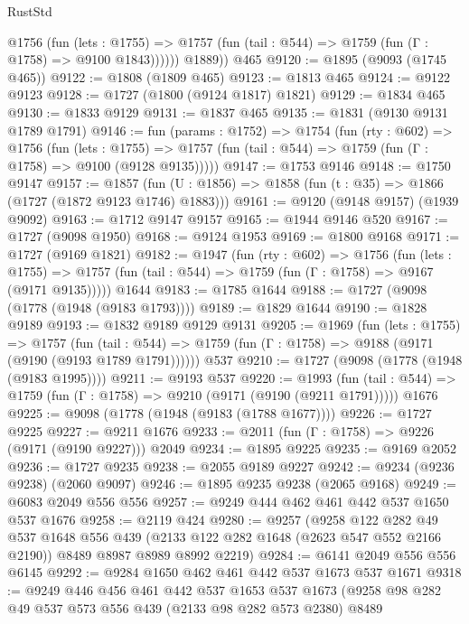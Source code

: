 \begin{lexlean}{RustStd}
\begin{coremodule}
            @1756
              (fun (lets : @1755) =>
              @1757 (fun (tail : @544) => @1759 (fun (Γ : @1758) => @9100 @1843))))))
        @1889))
    @465
@9120 := @1895 (@9093 (@1745 @465))
@9122 := @1808 (@1809 @465)
@9123 := @1813 @465
@9124 := @9122 @9123
@9128 := @1727 (@1800 (@9124 @1817) @1821)
@9129 := @1834 @465
@9130 := @1833 @9129
@9131 := @1837 @465
@9135 := @1831 (@9130 @9131 @1789 @1791)
@9146 := fun (params : @1752) =>
  @1754
    (fun (rty : @602) =>
    @1756
      (fun (lets : @1755) =>
      @1757 (fun (tail : @544) => @1759 (fun (Γ : @1758) => @9100 (@9128 @9135)))))
@9147 := @1753 @9146
@9148 := @1750 @9147
@9157 := @1857 (fun (U : @1856) => @1858 (fun (t : @35) => @1866 (@1727 (@1872 @9123 @1746) @1883)))
@9161 := @9120 (@9148 @9157) (@1939 @9092)
@9163 := @1712 @9147 @9157
@9165 := @1944 @9146 @520
@9167 := @1727 (@9098 @1950)
@9168 := @9124 @1953
@9169 := @1800 @9168
@9171 := @1727 (@9169 @1821)
@9182 := @1947
    (fun (rty : @602) =>
    @1756
      (fun (lets : @1755) =>
      @1757 (fun (tail : @544) => @1759 (fun (Γ : @1758) => @9167 (@9171 @9135)))))
    @1644
@9183 := @1785 @1644
@9188 := @1727 (@9098 (@1778 (@1948 (@9183 @1793))))
@9189 := @1829 @1644
@9190 := @1828 @9189
@9193 := @1832 @9189 @9129 @9131
@9205 := @1969
    (fun (lets : @1755) =>
    @1757
      (fun (tail : @544) => @1759 (fun (Γ : @1758) => @9188 (@9171 (@9190 (@9193 @1789 @1791))))))
    @537
@9210 := @1727 (@9098 (@1778 (@1948 (@9183 @1995))))
@9211 := @9193 @537
@9220 := @1993
    (fun (tail : @544) => @1759 (fun (Γ : @1758) => @9210 (@9171 (@9190 (@9211 @1791)))))
    @1676
@9225 := @9098 (@1778 (@1948 (@9183 (@1788 @1677))))
@9226 := @1727 @9225
@9227 := @9211 @1676
@9233 := @2011 (fun (Γ : @1758) => @9226 (@9171 (@9190 @9227))) @2049
@9234 := @1895 @9225
@9235 := @9169 @2052
@9236 := @1727 @9235
@9238 := @2055 @9189 @9227
@9242 := @9234 (@9236 @9238) (@2060 @9097)
@9246 := @1895 @9235 @9238 (@2065 @9168)
@9249 := @6083 @2049 @556 @556
@9257 := @9249 @444 @462 @461 @442 @537 @1650 @537 @1676
@9258 := @2119 @424
@9280 := @9257
    (@9258
      @122
      @282
      @49
      @537
      @1648
      @556
      @439
      (@2133 @122 @282 @1648 (@2623 @547 @552 @2166 @2190))
      @8489
      @8987
      @8989
      @8992
      @2219)
@9284 := @6141 @2049 @556 @556 @6145
@9292 := @9284 @1650 @462 @461 @442 @537 @1673 @537 @1671
@9318 := @9249
    @446
    @456
    @461
    @442
    @537
    @1653
    @537
    @1673
    (@9258
      @98
      @282
      @49
      @537
      @573
      @556
      @439
      (@2133 @98 @282 @573 @2380)
      @8489

\end{coremodule}
\end{lexlean}
